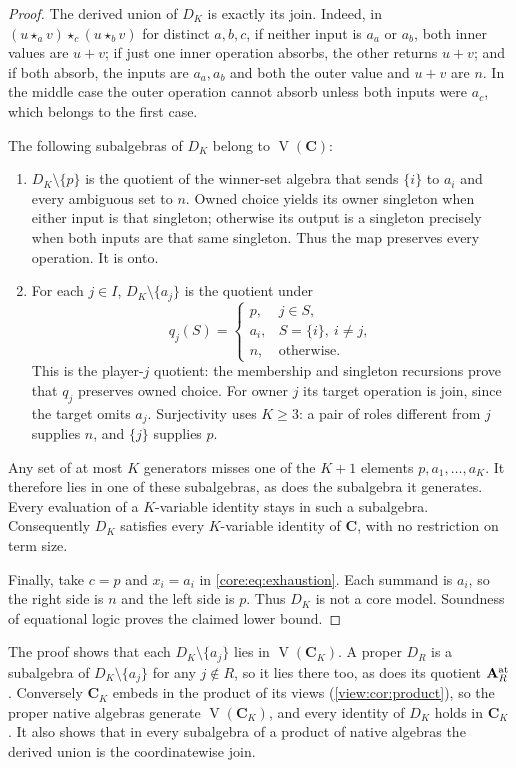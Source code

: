 \begin{proof}
The derived union of $D_K$ is exactly its join. Indeed, in
$(u\star_a v)\star_c(u\star_b v)$ for distinct $a,b,c$, if neither
input is $a_a$ or $a_b$, both inner values are $u+v$; if just one
inner operation absorbs, the other returns $u+v$; and if both absorb,
the inputs are $a_a,a_b$ and both the outer value and $u+v$ are $n$.
In the middle case the outer operation cannot absorb unless both
inputs were $a_c$, which belongs to the first case.

The following subalgebras of $D_K$ belong to
$\operatorname V(\mathbf C)$:
\begin{enumerate}
\item $D_K\setminus\{p\}$ is the quotient of the winner-set algebra
  that sends $\{i\}$ to $a_i$ and every ambiguous set to $n$.
  Owned choice yields its owner singleton when either input is that
  singleton; otherwise its output is a singleton precisely when
  both inputs are that same singleton. Thus the map preserves every
  operation. It is onto.
\item For each $j\in I$, $D_K\setminus\{a_j\}$ is the quotient under
  \[
  q_j(S)=
  \begin{cases}
  p,&j\in S,\\
  a_i,&S=\{i\},\ i\ne j,\\
  n,&\text{otherwise}.
  \end{cases}
  \]
  This is the player-$j$ quotient: the membership and singleton
  recursions prove that $q_j$ preserves owned choice. For owner $j$
  its target operation is join, since the target omits $a_j$.
  Surjectivity uses $K\geq3$: a pair of roles different from $j$
  supplies $n$, and $\{j\}$ supplies $p$.
\end{enumerate}

Any set of at most $K$ generators misses one of the $K+1$ elements
$p,a_1,\ldots,a_K$. It therefore lies in one of these subalgebras,
as does the subalgebra it generates. Every evaluation of a
$K$-variable identity stays in such a subalgebra. Consequently
$D_K$ satisfies every $K$-variable identity of $\mathbf C$,
with no restriction on term size.

Finally, take $c=p$ and $x_i=a_i$ in
\eqref{core:eq:exhaustion}. Each summand is $a_i$, so the right
side is $n$ and the left side is $p$. Thus $D_K$ is not a core
model. Soundness of equational logic proves the claimed lower bound.
\end{proof}

The proof shows that each $D_K\setminus\{a_j\}$ lies in
$\operatorname V(\mathbf C_K)$. A proper $D_R$ is a subalgebra of
$D_K\setminus\{a_j\}$ for any $j\notin R$, so it lies there too, as does
its quotient $\mathbf A_R^{\rm at}$. Conversely $\mathbf C_K$ embeds in the
product of its views (\cref{view:cor:product}), so the proper native
algebras generate $\operatorname V(\mathbf C_K)$, and every identity of
$D_K$ holds in $\mathbf C_K$. It also shows that in every subalgebra of a
product of native algebras the derived union is the coordinatewise join.

